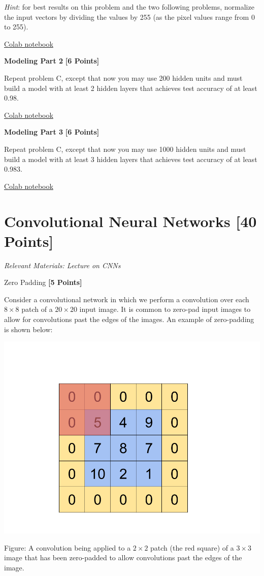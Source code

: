 \textit{Hint}: for best results on this problem and the two following problems, normalize the input vectors by dividing the values by 255 (as the pixel values range from 0 to 255).

\begin{solution}
  \href{https://colab.research.google.com/drive/1kJSHcO2rkfjy8dI7cmosdyE0AFt7CgQw?usp=sharing}{Colab notebook}
\end{solution}


 \problem \textbf{Modeling Part 2} \textbf{[6 Points]}

 Repeat problem C, except that now you may use 200 hidden units and must build a model with at least 2 hidden layers that achieves test accuracy of at least 0.98.

 \begin{solution}
  \href{https://colab.research.google.com/drive/1bqq780Om3kQ0n-LfnJC7EHFOkotyONkU?usp=sharing}{Colab notebook}
\end{solution}

  \problem \textbf{Modeling Part 3} \textbf{[6 Points]}

 Repeat problem C, except that now you may use 1000 hidden units and must build a model with at least 3 hidden layers that achieves test accuracy of at least 0.983.

\begin{solution}
  \href{https://colab.research.google.com/drive/12DOpEUUNVrT8DvGa2TEbIU8iZoKK2jPn?usp=sharing}{Colab notebook}
\end{solution}

 \newpage
 \section{Convolutional Neural Networks  [40 Points]}
 \textit{Relevant Materials: Lecture on CNNs}

 \problem Zero Padding \textbf{[5 Points]}

 Consider a convolutional network in which we perform a convolution over each $8 \times 8$ patch of a $20 \times 20$ input image. It is common to zero-pad input images to allow for convolutions past the edges of the images. An example of zero-padding is shown below:

\begin{center}
  \includegraphics[width=.49\textwidth]{Plots/ConvolutionExample.png}
\end{center}
\begin{small}
Figure: A convolution being applied to a $2 \times 2$ patch (the red square) of a $3 \times 3$ image that has been zero-padded to allow convolutions past the edges of the image.
\end{small}

